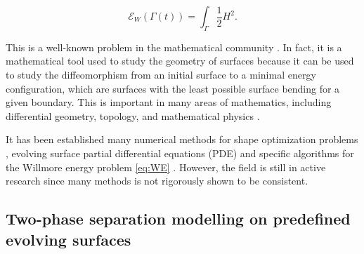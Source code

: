 \begin{equation}
\label{eq:WE}
\mathcal{E} _{W} \left( \Gamma\left( t \right)   \right) = \int_{\Gamma  }^{} \frac{1}{2} H ^2
.\end{equation}

This is a well-known problem in the mathematical community \cite{ topping2000towards, marques2014willmore,link2013gradient,kuwert2012willmore}. In fact, it is a mathematical tool used to study the geometry of surfaces because it can be used to study
the diffeomorphism from an initial surface to a minimal energy configuration, which are surfaces with the least possible surface bending for a given boundary. This is important in many areas of mathematics, including differential geometry, topology, and mathematical physics \cite{koerber2021area,jakob2022singularities, rupp21}.

It has been established many numerical methods for shape optimization problems \cite{sokolowski1992introduction,ito2008variational}, evolving surface partial differential equations (PDE) \cite{dziuk2013finite, dziuk2007finite,
binz2022convergent, barrett2007parametric, barrett2007variational, kovacs2019convergent, lehrenfeld2018stabilized} and specific
algorithms for the Willmore energy problem \eqref{eq:WE} \cite{palmurella2022parametric, dziuk2008computational, bonito2010parametric,  kovacs2021convergent, hu2022evolving}. However, the field is still in active research since many methods is not rigorously shown to be consistent.

\subsection{Two-phase separation modelling on predefined evolving surfaces }%
\label{sub:two_phase_seperation_modelling_on_surfaces_}

